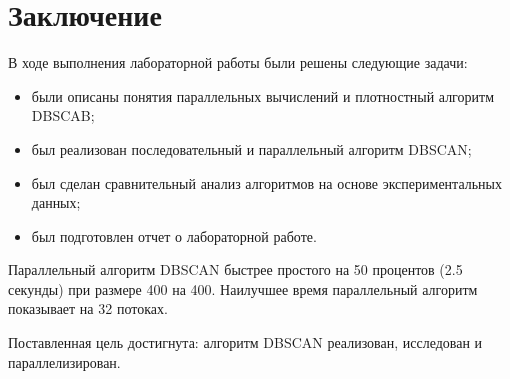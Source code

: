 \chapter*{Заключение}

В ходе выполнения лабораторной работы были решены следующие задачи:

\begin{itemize}
	\item были описаны понятия параллельных вычислений и плотностный алгоритм DBSCAB;
	
	\item был реализован последовательный и параллельный алгоритм DBSCAN;
	\item был сделан сравнительный анализ алгоритмов на основе экспериментальных данных;
	
	\item был подготовлен отчет о лабораторной работе.
\end{itemize}

Параллельный алгоритм DBSCAN быстрее простого на 50 процентов (2.5 секунды) при размере 400 на 400.
Наилучшее время параллельный алгоритм показывает на 32 потоках.  

Поставленная цель достигнута: алгоритм DBSCAN реализован, исследован и параллелизирован.